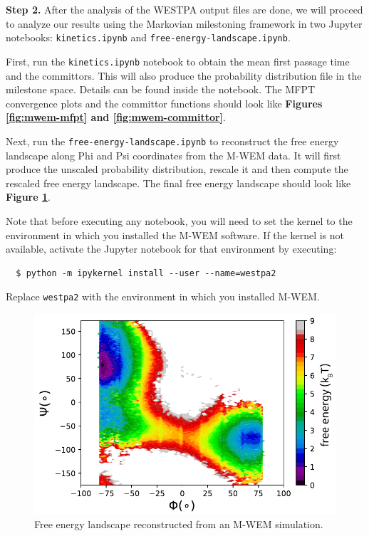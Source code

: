 \textbf{Step 2.} After the analysis of the WESTPA output files are done, we will proceed to analyze our results using the Markovian milestoning framework in two Jupyter notebooks: \verb|kinetics.ipynb| and \verb|free-energy-landscape.ipynb|.

First, run the \verb|kinetics.ipynb| notebook to obtain the mean first passage time and the committors. 
This will also produce the probability distribution file in the milestone space. Details can be found inside the notebook. 
The MFPT convergence plots and the committor functions should look like \textbf{Figures \ref{fig:mwem-mfpt} and \ref{fig:mwem-committor}}.

Next, run the \verb|free-energy-landscape.ipynb| to reconstruct the free energy landscape along Phi and Psi coordinates from the M-WEM data. 
It will first produce the unscaled probability distribution, rescale it and then compute the rescaled free energy landscape. 
The final free energy landscape should look like \textbf{Figure \ref{fig:mwem-landscape}}.

Note that before executing any notebook, you will need to set the kernel to the environment in which you installed the M-WEM software. 
If the kernel is not available, activate the Jupyter notebook for that environment by executing:

\begin{verbatim}
  $ python -m ipykernel install --user --name=westpa2
\end{verbatim}
Replace \verb|westpa2| with the environment in which you installed M-WEM.

\begin{figure}[t]
\centering
\includegraphics[width=\columnwidth]{figures/Figure12_RFree.pdf}
\caption{Free energy landscape reconstructed from an M-WEM simulation.}
\label{fig:mwem-landscape}
\end{figure}

